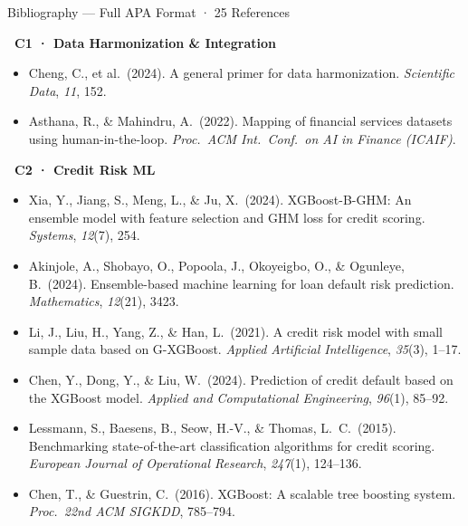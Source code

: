 \documentclass[9pt,aspectratio=169]{beamer}
\begin{document}
\begin{frame}[allowframebreaks]{Bibliography \textnormal{\footnotesize --- Full APA Format · 25 References}}
\tiny\setlength{\parskip}{0pt}

\noindent\colorbox{steelblue!25}{\scriptsize\textbf{~C1 · Data Harmonization \& Integration~}}\\[2pt]
\begin{itemize}\setlength\itemsep{2pt}
  \item Cheng, C., et al.\ (2024). A general primer for data harmonization. \textit{Scientific Data}, \textit{11}, 152.
  \item Asthana, R., \& Mahindru, A.\ (2022). Mapping of financial services datasets using human-in-the-loop. \textit{Proc.\ ACM Int.\ Conf.\ on AI in Finance (ICAIF)}.
\end{itemize}\vspace{4pt}

\noindent\colorbox{orange!30}{\scriptsize\textbf{~C2 · Credit Risk ML~}}\\[2pt]
\begin{itemize}\setlength\itemsep{2pt}
  \item Xia, Y., Jiang, S., Meng, L., \& Ju, X.\ (2024). XGBoost-B-GHM: An ensemble model with feature selection and GHM loss for credit scoring. \textit{Systems}, \textit{12}(7), 254.
  \item Akinjole, A., Shobayo, O., Popoola, J., Okoyeigbo, O., \& Ogunleye, B.\ (2024). Ensemble-based machine learning for loan default risk prediction. \textit{Mathematics}, \textit{12}(21), 3423.
  \item Li, J., Liu, H., Yang, Z., \& Han, L.\ (2021). A credit risk model with small sample data based on G-XGBoost. \textit{Applied Artificial Intelligence}, \textit{35}(3), 1--17.
  \item Chen, Y., Dong, Y., \& Liu, W.\ (2024). Prediction of credit default based on the XGBoost model. \textit{Applied and Computational Engineering}, \textit{96}(1), 85--92.
  \item Lessmann, S., Baesens, B., Seow, H.-V., \& Thomas, L.\ C.\ (2015). Benchmarking state-of-the-art classification algorithms for credit scoring. \textit{European Journal of Operational Research}, \textit{247}(1), 124--136.
  \item Chen, T., \& Guestrin, C.\ (2016). XGBoost: A scalable tree boosting system. \textit{Proc.\ 22nd ACM SIGKDD}, 785--794.
\end{itemize}\vspace{4pt}


\end{frame}
\end{document}
